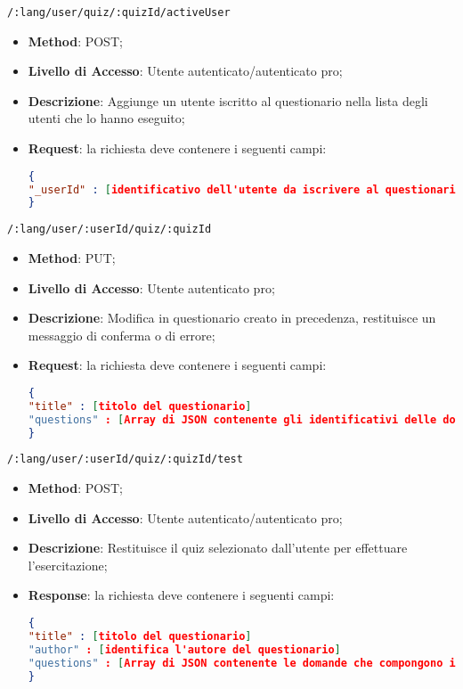 	\item \texttt{/:lang/user/quiz/:quizId/activeUser}
	\begin{itemize}
		\item \textbf{Method}: POST;
		\item \textbf{Livello di Accesso}: Utente autenticato/autenticato pro;
		\item \textbf{Descrizione}: Aggiunge un utente iscritto al questionario nella lista degli utenti che lo hanno eseguito;
		\item \textbf{Request}: la richiesta deve contenere i seguenti campi:
\begin{lstlisting}[language=json,firstnumber=1]
{
"_userId" : [identificativo dell'utente da iscrivere al questionario]
}
\end{lstlisting}
	\end{itemize}
	
	\item \texttt{/:lang/user/:userId/quiz/:quizId}
	\begin{itemize}
		\item \textbf{Method}: PUT;
		\item \textbf{Livello di Accesso}: Utente autenticato pro;
		\item \textbf{Descrizione}: Modifica in questionario creato in precedenza, restituisce un messaggio di conferma o di errore;
		\item \textbf{Request}: la richiesta deve contenere i seguenti campi:
\begin{lstlisting}[language=json,firstnumber=1]
{
"title" : [titolo del questionario]
"questions" : [Array di JSON contenente gli identificativi delle domande che compongono il questionario]
}
\end{lstlisting}
	\end{itemize}
	
	\item \texttt{/:lang/user/:userId/quiz/:quizId/test}
	\begin{itemize}
		\item \textbf{Method}: POST;
		\item \textbf{Livello di Accesso}: Utente autenticato/autenticato pro;
		\item \textbf{Descrizione}: Restituisce il quiz selezionato dall'utente per effettuare l'esercitazione;
		\item \textbf{Response}: la richiesta deve contenere i seguenti campi:
\begin{lstlisting}[language=json,firstnumber=1]
{
"title" : [titolo del questionario]
"author" : [identifica l'autore del questionario]
"questions" : [Array di JSON contenente le domande che compongono il questionario]
}
\end{lstlisting}
	\end{itemize}
	

